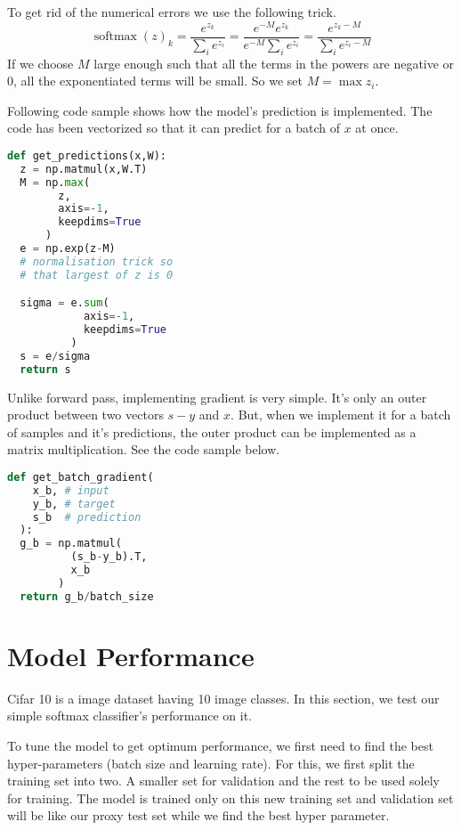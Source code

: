 \documentclass[12pt,crop=false,class=article,convert={density=300,outext=.compiled.png}]{standalone}
\begin{document}
To get rid of the numerical errors we use the following trick.
%
$$\operatorname{softmax}(z)_k = \frac{e^{z_k}}{\sum_i e^{z_i}}= \frac{e^{-M}e^{z_k}}{e^{-M}\sum_i e^{z_i}}= \frac{e^{z_k-M}}{\sum_i e^{z_i-M}}$$
%
If we choose $M$ large enough such that all the terms in the powers are
negative or $0$, all the exponentiated terms will be small. So we set
$M = \max z_i$.

Following code sample shows how the model's prediction is implemented.
The code has been vectorized so that it can predict for a batch of $x$
at once.

\begin{lstlisting}[language=Python]
def get_predictions(x,W):
  z = np.matmul(x,W.T)
  M = np.max(
        z,
        axis=-1,
        keepdims=True
      )
  e = np.exp(z-M)
  # normalisation trick so
  # that largest of z is 0

  sigma = e.sum(
            axis=-1,
            keepdims=True
          )
  s = e/sigma
  return s
\end{lstlisting}

Unlike forward pass, implementing gradient is very simple. It's only an
outer product between two vectors $s-y$ and $x$. But, when we implement
it for a batch of samples and it's predictions, the outer product can be
implemented as a matrix multiplication. See the code sample below.

\begin{lstlisting}[language=Python]
def get_batch_gradient(
    x_b, # input
    y_b, # target
    s_b  # prediction
  ):
  g_b = np.matmul(
          (s_b-y_b).T,
          x_b
        )
  return g_b/batch_size
\end{lstlisting}

\section*{Model Performance}

Cifar 10 is a image
dataset having 10 image classes. In this section, we test our simple
softmax classifier's performance on it.

To tune the model to get optimum performance, we first need to find the
best hyper-parameters (batch size and learning rate). For this, we first
split the training set into two. A smaller set for validation and the
rest to be used solely for training. The model is trained only on this
new training set and validation set will be like our proxy test set
while we find the best hyper parameter.
\end{document}
